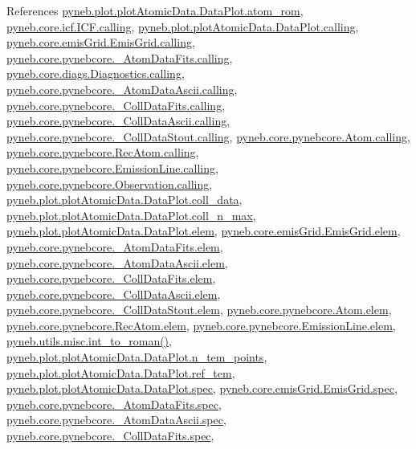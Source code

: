 References \hyperlink{plot_atomic_data_8py_source_l00103}{pyneb.\-plot.\-plot\-Atomic\-Data.\-Data\-Plot.\-atom\-\_\-rom}, \hyperlink{icf_8py_source_l00016}{pyneb.\-core.\-icf.\-I\-C\-F.\-calling}, \hyperlink{plot_atomic_data_8py_source_l00042}{pyneb.\-plot.\-plot\-Atomic\-Data.\-Data\-Plot.\-calling}, \hyperlink{emis_grid_8py_source_l00044}{pyneb.\-core.\-emis\-Grid.\-Emis\-Grid.\-calling}, \hyperlink{pynebcore_8py_source_l00097}{pyneb.\-core.\-pynebcore.\-\_\-\-Atom\-Data\-Fits.\-calling}, \hyperlink{diags_8py_source_l00169}{pyneb.\-core.\-diags.\-Diagnostics.\-calling}, \hyperlink{pynebcore_8py_source_l00318}{pyneb.\-core.\-pynebcore.\-\_\-\-Atom\-Data\-Ascii.\-calling}, \hyperlink{pynebcore_8py_source_l00585}{pyneb.\-core.\-pynebcore.\-\_\-\-Coll\-Data\-Fits.\-calling}, \hyperlink{pynebcore_8py_source_l00936}{pyneb.\-core.\-pynebcore.\-\_\-\-Coll\-Data\-Ascii.\-calling}, \hyperlink{pynebcore_8py_source_l01156}{pyneb.\-core.\-pynebcore.\-\_\-\-Coll\-Data\-Stout.\-calling}, \hyperlink{pynebcore_8py_source_l01229}{pyneb.\-core.\-pynebcore.\-Atom.\-calling}, \hyperlink{pynebcore_8py_source_l02643}{pyneb.\-core.\-pynebcore.\-Rec\-Atom.\-calling}, \hyperlink{pynebcore_8py_source_l03385}{pyneb.\-core.\-pynebcore.\-Emission\-Line.\-calling}, \hyperlink{pynebcore_8py_source_l03541}{pyneb.\-core.\-pynebcore.\-Observation.\-calling}, \hyperlink{plot_atomic_data_8py_source_l00072}{pyneb.\-plot.\-plot\-Atomic\-Data.\-Data\-Plot.\-coll\-\_\-data}, \hyperlink{plot_atomic_data_8py_source_l00111}{pyneb.\-plot.\-plot\-Atomic\-Data.\-Data\-Plot.\-coll\-\_\-n\-\_\-max}, \hyperlink{plot_atomic_data_8py_source_l00045}{pyneb.\-plot.\-plot\-Atomic\-Data.\-Data\-Plot.\-elem}, \hyperlink{emis_grid_8py_source_l00048}{pyneb.\-core.\-emis\-Grid.\-Emis\-Grid.\-elem}, \hyperlink{pynebcore_8py_source_l00090}{pyneb.\-core.\-pynebcore.\-\_\-\-Atom\-Data\-Fits.\-elem}, \hyperlink{pynebcore_8py_source_l00311}{pyneb.\-core.\-pynebcore.\-\_\-\-Atom\-Data\-Ascii.\-elem}, \hyperlink{pynebcore_8py_source_l00577}{pyneb.\-core.\-pynebcore.\-\_\-\-Coll\-Data\-Fits.\-elem}, \hyperlink{pynebcore_8py_source_l00927}{pyneb.\-core.\-pynebcore.\-\_\-\-Coll\-Data\-Ascii.\-elem}, \hyperlink{pynebcore_8py_source_l01163}{pyneb.\-core.\-pynebcore.\-\_\-\-Coll\-Data\-Stout.\-elem}, \hyperlink{pynebcore_8py_source_l01219}{pyneb.\-core.\-pynebcore.\-Atom.\-elem}, \hyperlink{pynebcore_8py_source_l02636}{pyneb.\-core.\-pynebcore.\-Rec\-Atom.\-elem}, \hyperlink{pynebcore_8py_source_l03389}{pyneb.\-core.\-pynebcore.\-Emission\-Line.\-elem}, \hyperlink{misc_8py_source_l00055}{pyneb.\-utils.\-misc.\-int\-\_\-to\-\_\-roman()}, \hyperlink{plot_atomic_data_8py_source_l00104}{pyneb.\-plot.\-plot\-Atomic\-Data.\-Data\-Plot.\-n\-\_\-tem\-\_\-points}, \hyperlink{plot_atomic_data_8py_source_l00076}{pyneb.\-plot.\-plot\-Atomic\-Data.\-Data\-Plot.\-ref\-\_\-tem}, \hyperlink{plot_atomic_data_8py_source_l00046}{pyneb.\-plot.\-plot\-Atomic\-Data.\-Data\-Plot.\-spec}, \hyperlink{emis_grid_8py_source_l00049}{pyneb.\-core.\-emis\-Grid.\-Emis\-Grid.\-spec}, \hyperlink{pynebcore_8py_source_l00091}{pyneb.\-core.\-pynebcore.\-\_\-\-Atom\-Data\-Fits.\-spec}, \hyperlink{pynebcore_8py_source_l00312}{pyneb.\-core.\-pynebcore.\-\_\-\-Atom\-Data\-Ascii.\-spec}, \hyperlink{pynebcore_8py_source_l00578}{pyneb.\-core.\-pynebcore.\-\_\-\-Coll\-Data\-Fits.\-spec}, 